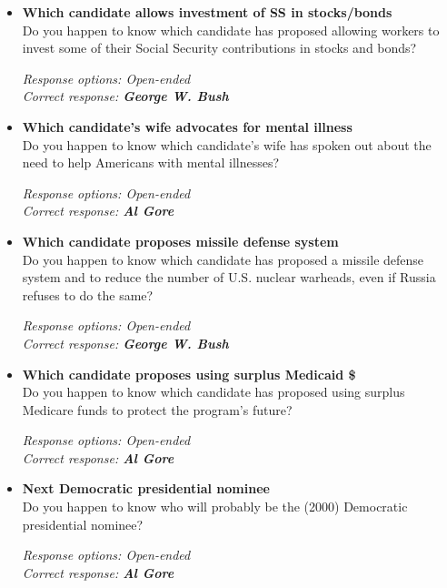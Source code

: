 \documentclass[12pt, letterpaper]{article}
\begin{document}
   \begin{itemize}
\item \textbf{Which candidate allows investment of SS in stocks/bonds} \\
Do you happen to know which candidate has proposed allowing workers to invest some of their Social Security contributions in stocks and bonds?

\textit{Response options: Open-ended}\\
\textit{Correct response: \textbf{George W. Bush}}
\end{itemize}

  \begin{itemize}
\item \textbf{Which candidate's wife advocates for mental illness }\\
Do you happen to know which candidate's wife has spoken out about the need to help Americans with mental illnesses?

\textit{Response options: Open-ended}\\
\textit{Correct response: \textbf{Al Gore}}
\end{itemize}

  \begin{itemize}
\item \textbf{Which candidate proposes missile defense system}\\
Do you happen to know which candidate has proposed a missile defense system and to reduce the number of U.S. nuclear warheads, even if Russia refuses to do the same?

\textit{Response options: Open-ended}\\
\textit{Correct response: \textbf{George W. Bush}}
\end{itemize}

  \begin{itemize}
\item \textbf{Which candidate proposes using surplus Medicaid \$}\\
Do you happen to know which candidate has proposed using surplus Medicare funds to protect the program's future?

\textit{Response options: Open-ended}\\
\textit{Correct response: \textbf{Al Gore}}
\end{itemize}

  \begin{itemize}
\item \textbf{Next Democratic presidential nominee}\\
Do you happen to know who will probably be the (2000) Democratic presidential nominee?

\textit{Response options: Open-ended}\\
\textit{Correct response: \textbf{Al Gore}}
\end{itemize}
\end{document}
